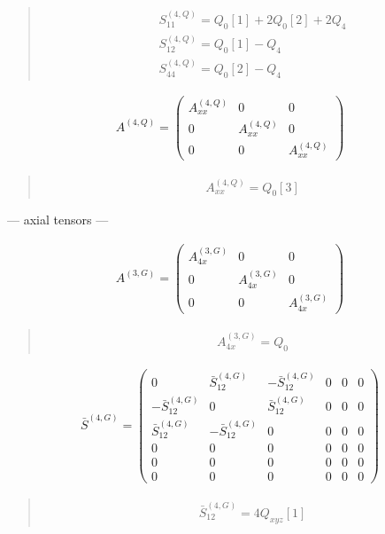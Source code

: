 \documentclass[fleqn,10pt]{jsarticle}
\begin{document}
\begin{quote}
\begin{align*}
& S^{(4,Q)}_{11} = Q_{0}[1] + 2 Q_{0}[2] + 2 Q_{4} \\
& S^{(4,Q)}_{12} = Q_{0}[1] - Q_{4} \\
& S^{(4,Q)}_{44} = Q_{0}[2] - Q_{4}
\end{align*}
\end{quote}
\begin{align*}
A^{(4,Q)} = \begin{pmatrix} A^{(4,Q)}_{xx} & 0 & 0 \\ 0 & A^{(4,Q)}_{xx} & 0 \\ 0 & 0 & A^{(4,Q)}_{xx} \end{pmatrix}
\end{align*}
\begin{quote}
\begin{align*}
& A^{(4,Q)}_{xx} = Q_{0}[3]
\end{align*}
\end{quote}
\newpage
\begin{center}\LARGE --- axial tensors ---\end{center}
\begin{align*}
A^{(3,G)} = \begin{pmatrix} A^{(3,G)}_{4x} & 0 & 0 \\ 0 & A^{(3,G)}_{4x} & 0 \\ 0 & 0 & A^{(3,G)}_{4x} \end{pmatrix}
\end{align*}
\begin{quote}
\begin{align*}
& A^{(3,G)}_{4x} = Q_{0}
\end{align*}
\end{quote}
\begin{align*}
\bar{S}^{(4,G)} = \begin{pmatrix} 0 & \bar{S}^{(4,G)}_{12} & - \bar{S}^{(4,G)}_{12} & 0 & 0 & 0 \\ - \bar{S}^{(4,G)}_{12} & 0 & \bar{S}^{(4,G)}_{12} & 0 & 0 & 0 \\ \bar{S}^{(4,G)}_{12} & - \bar{S}^{(4,G)}_{12} & 0 & 0 & 0 & 0 \\ 0 & 0 & 0 & 0 & 0 & 0 \\ 0 & 0 & 0 & 0 & 0 & 0 \\ 0 & 0 & 0 & 0 & 0 & 0 \end{pmatrix}
\end{align*}
\begin{quote}
\begin{align*}
& \bar{S}^{(4,G)}_{12} = 4 Q_{xyz}[1]
\end{align*}
\end{quote}
\end{document}
